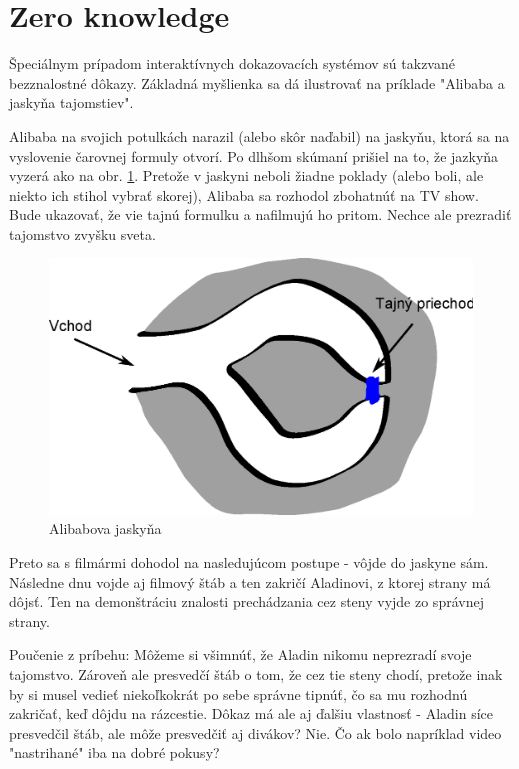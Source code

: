 \section{Zero knowledge}
Špeciálnym prípadom interaktívnych dokazovacích systémov sú takzvané
bezznalostné dôkazy. Základná myšlienka sa dá ilustrovať na príklade 
"Alibaba a jaskyňa tajomstiev".

Alibaba na svojich potulkách narazil (alebo skôr naďabil) na jaskyňu,
ktorá sa na vyslovenie čarovnej formuly otvorí. Po dlhšom skúmaní
prišiel na to, že jazkyňa vyzerá ako na obr. \ref{fig:alibaba}. Pretože v
jaskyni neboli žiadne poklady (alebo boli, ale niekto ich stihol
vybrať skorej), Alibaba sa rozhodol zbohatnúť na TV show.
Bude ukazovať, že vie tajnú formulku a nafilmujú ho pritom. Nechce ale
prezradiť tajomstvo zvyšku sveta.

\begin{figure}[htp]
    \centering
    \includegraphics[scale=0.4]{img/x/alibaba}
    
    \label{fig:alibaba}
    \caption{Alibabova jaskyňa}
\end{figure}

Preto sa s filmármi dohodol na nasledujúcom postupe - vôjde do jaskyne
sám. Následne dnu vojde aj filmový štáb a ten zakričí Aladinovi, z
ktorej strany má dôjsť. Ten na demonštráciu znalosti prechádzania cez
steny vyjde zo správnej strany.

Poučenie z príbehu: Môžeme si všimnúť, že Aladin nikomu neprezradí
svoje tajomstvo. Zároveň ale presvedčí štáb o tom, že cez tie steny
chodí, pretože inak by si musel vedieť niekoľkokrát po sebe správne
tipnúť, čo sa mu rozhodnú zakričať, keď dôjdu na rázcestie.
Dôkaz má ale aj ďalšiu vlastnosť - Aladin síce presvedčil štáb, ale
môže presvedčiť aj divákov? Nie. Čo ak bolo napríklad video
"nastrihané" iba na dobré pokusy?

